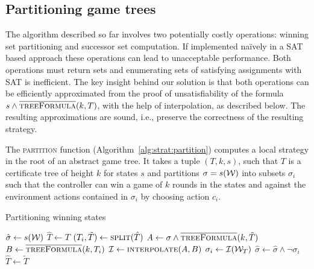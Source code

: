 \subsection{Partitioning game trees}

The algorithm described so far involves two potentially costly operations: winning set partitioning and successor set computation.  If implemented na\"ively in a SAT based approach these operations can lead to unacceptable performance. Both operations must return sets and enumerating sets of satisfying assignments with SAT is inefficient. The key insight behind our solution is that both operations can be efficiently approximated from the proof of unsatisfiability of the formula $s \land \textsc{$\overline{\mbox{treeFormula}}$}(k, T)$, with the help of interpolation, as described below.  The resulting approximations are sound, i.e., preserve the correctness of the resulting strategy.

The \textsc{partition} function (Algorithm~\ref{alg:strat:partition}) computes a local strategy in the root of an abstract game tree.  It takes a tuple $(T, k, s)$, such that $T$ is a certificate tree of height $k$ for states $s$ and partitions $\sigma = s(\mathcal{W})$ into subsets $\sigma_i$ such that the controller can win a game of $k$ rounds in the states and against the environment actions contained in $\sigma_i$ by choosing action $c_i$.

\begin{algorithm}[t]
   \caption{Partitioning winning states}\label{alg:strat:partition}
   \begin{algorithmic}[1]
        \State $\hat{\sigma} \gets s(\mathcal{W})$
        \State $\hat{T} \gets T$
        \State $(T_i, \tilde{T}) \gets \Call{split}{\hat{T}}$\label{alg:partition:split}
            \State $A \gets \sigma \land \Call{\opptf}{k, \tilde{T}} $ \label{alg:strat:partition:Bi}
            \State $B \gets \Call{\opptf}{k, T_i} $ \label{alg:strat:partition:Ai}
            \State $\mathcal{I} \gets \Call{interpolate}{A, B}$\label{alg:partition:I}
            \State $\sigma_i \gets \mathcal{I}(\mathcal{W}_T)$\label{alg:partition:Ii}
            \State $\hat{\sigma} \gets \hat{\sigma} \land \neg \sigma_i$
            \State $\hat{T} \gets \tilde{T}$\label{alg:partition:upd}
        \EndFor
        \State {} \label{alg:strat:partition:return}
        \EndFunction
    \end{algorithmic}
\end{algorithm}

